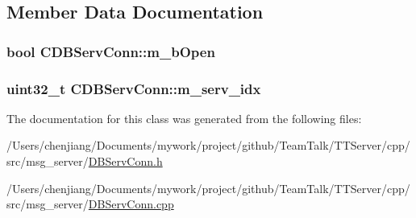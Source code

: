 \subsection{Member Data Documentation}
\hypertarget{class_c_d_b_serv_conn_a039c6bda3f5708e37725b1ecdfd2c715}{}
\subsubsection[{m\+\_\+b\+Open}]{\setlength{\rightskip}{0pt plus 5cm}bool C\+D\+B\+Serv\+Conn\+::m\+\_\+b\+Open\hspace{0.3cm}{\ttfamily [private]}}\label{class_c_d_b_serv_conn_a039c6bda3f5708e37725b1ecdfd2c715}
\hypertarget{class_c_d_b_serv_conn_a2960dec1cee1c751ee217ea9867d819d}{}
\subsubsection[{m\+\_\+serv\+\_\+idx}]{\setlength{\rightskip}{0pt plus 5cm}uint32\+\_\+t C\+D\+B\+Serv\+Conn\+::m\+\_\+serv\+\_\+idx\hspace{0.3cm}{\ttfamily [private]}}\label{class_c_d_b_serv_conn_a2960dec1cee1c751ee217ea9867d819d}


The documentation for this class was generated from the following files\+:\begin{DoxyCompactItemize}
\item 
/\+Users/chenjiang/\+Documents/mywork/project/github/\+Team\+Talk/\+T\+T\+Server/cpp/src/msg\+\_\+server/\hyperlink{_d_b_serv_conn_8h}{D\+B\+Serv\+Conn.\+h}\item 
/\+Users/chenjiang/\+Documents/mywork/project/github/\+Team\+Talk/\+T\+T\+Server/cpp/src/msg\+\_\+server/\hyperlink{_d_b_serv_conn_8cpp}{D\+B\+Serv\+Conn.\+cpp}\end{DoxyCompactItemize}
